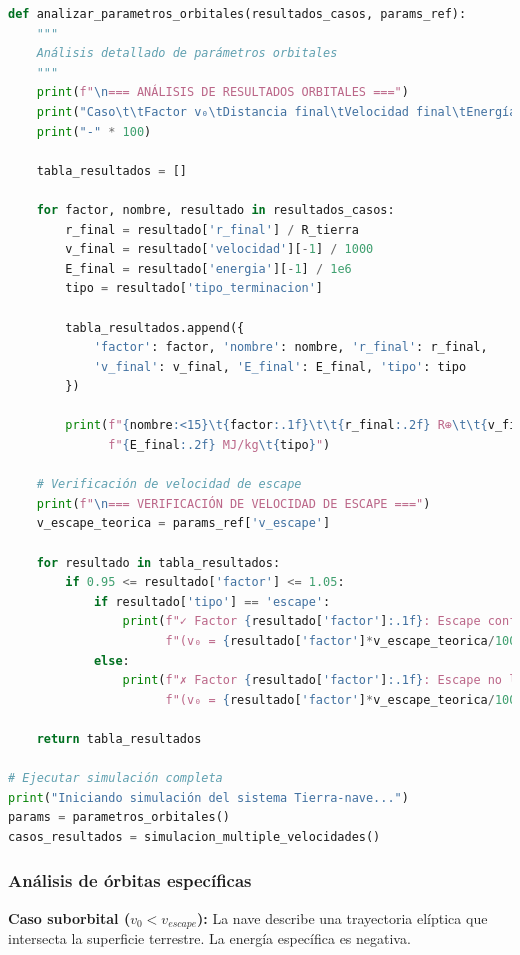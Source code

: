 \documentclass{article}
\begin{document}
\begin{lstlisting}[language=Python, caption={Análisis completo del sistema Tierra-nave}]
def analizar_parametros_orbitales(resultados_casos, params_ref):
    """
    Análisis detallado de parámetros orbitales
    """
    print(f"\n=== ANÁLISIS DE RESULTADOS ORBITALES ===")
    print("Caso\t\tFactor v₀\tDistancia final\tVelocidad final\tEnergía final\tTipo resultado")
    print("-" * 100)
    
    tabla_resultados = []
    
    for factor, nombre, resultado in resultados_casos:
        r_final = resultado['r_final'] / R_tierra
        v_final = resultado['velocidad'][-1] / 1000
        E_final = resultado['energia'][-1] / 1e6
        tipo = resultado['tipo_terminacion']
        
        tabla_resultados.append({
            'factor': factor, 'nombre': nombre, 'r_final': r_final,
            'v_final': v_final, 'E_final': E_final, 'tipo': tipo
        })
        
        print(f"{nombre:<15}\t{factor:.1f}\t\t{r_final:.2f} R⊕\t\t{v_final:.2f} km/s\t"
              f"{E_final:.2f} MJ/kg\t{tipo}")
    
    # Verificación de velocidad de escape
    print(f"\n=== VERIFICACIÓN DE VELOCIDAD DE ESCAPE ===")
    v_escape_teorica = params_ref['v_escape']
    
    for resultado in tabla_resultados:
        if 0.95 <= resultado['factor'] <= 1.05:
            if resultado['tipo'] == 'escape':
                print(f"✓ Factor {resultado['factor']:.1f}: Escape confirmado "
                      f"(v₀ = {resultado['factor']*v_escape_teorica/1000:.2f} km/s)")
            else:
                print(f"✗ Factor {resultado['factor']:.1f}: Escape no logrado "
                      f"(v₀ = {resultado['factor']*v_escape_teorica/1000:.2f} km/s)")
    
    return tabla_resultados

# Ejecutar simulación completa
print("Iniciando simulación del sistema Tierra-nave...")
params = parametros_orbitales()
casos_resultados = simulacion_multiple_velocidades()
	\end{lstlisting}

	\subsubsection{Análisis de órbitas específicas}
	
	\textbf{Caso suborbital ($v_0 < v_{escape}$):}
	La nave describe una trayectoria elíptica que intersecta la superficie terrestre. La energía específica es negativa.
	
\end{document}
